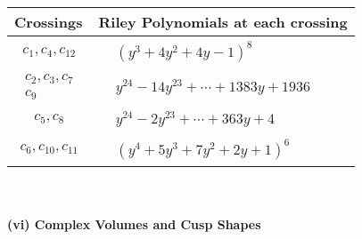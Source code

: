\documentclass[1p]{elsarticle_modified}
\theoremstyle{definition}
\begin{document}
\begin{tabular}{m{50pt}|m{274pt}}
Crossings & \hspace{64pt}Riley Polynomials at each crossing \\
\hline $$\begin{aligned}c_{1},c_{4},c_{12}\end{aligned}$$&$\begin{aligned}
&(y^3+4 y^2+4 y-1)^8
\end{aligned}$\\
\hline $$\begin{aligned}c_{2},c_{3},c_{7}\\c_{9}\end{aligned}$$&$\begin{aligned}
&y^{24}-14 y^{23}+\cdots+1383 y+1936
\end{aligned}$\\
\hline $$\begin{aligned}c_{5},c_{8}\end{aligned}$$&$\begin{aligned}
&y^{24}-2 y^{23}+\cdots+363 y+4
\end{aligned}$\\
\hline $$\begin{aligned}c_{6},c_{10},c_{11}\end{aligned}$$&$\begin{aligned}
&(y^4+5 y^3+7 y^2+2 y+1)^6
\end{aligned}$\\
\hline
\end{tabular}\\~\\
\newpage\flushleft \textbf{(vi) Complex Volumes and Cusp Shapes}
\end{document}
